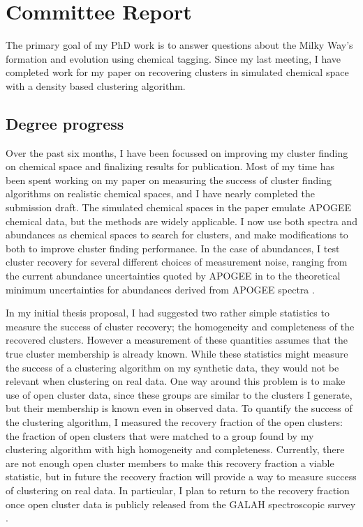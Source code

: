 \documentclass[11pt]{article}
\begin{document}
    
    \section*{Committee Report}
    
    The primary goal of my PhD work is to answer questions about the Milky Way's formation and evolution using chemical tagging. Since my last meeting, I have completed work for my paper on recovering clusters in simulated chemical space with a density based clustering algorithm.    

    \subsection*{Degree progress}

	Over the past six months, I have been focussed on improving my cluster finding on chemical space and finalizing results for publication. Most of my time has been spent working on my paper on measuring the success of cluster finding algorithms on realistic chemical spaces, and I have nearly completed the submission draft. The simulated chemical spaces in the paper emulate APOGEE \citep{Majewski2017} chemical data, but the methods are widely applicable. I now use both spectra and abundances as chemical spaces to search for clusters, and make modifications to both to improve cluster finding performance. In the case of abundances, I test cluster recovery for several different choices of measurement noise, ranging from the current abundance uncertainties quoted by APOGEE in \citealt{DR14} to the theoretical minimum uncertainties for abundances derived from APOGEE spectra \citep{Ting}.
	
	In my initial thesis proposal, I had suggested two rather simple statistics to measure the success of cluster recovery; the homogeneity and completeness of the recovered clusters. However a measurement of these quantities assumes that the true cluster membership is already known. While these statistics might measure the success of a clustering algorithm on my synthetic data, they would not be relevant when clustering on real data. One way around this problem is to make use of open cluster data, since these groups are similar to the clusters I generate, but their membership is known even in observed data. To quantify the success of the clustering algorithm, I measured the recovery fraction of the open clusters: the fraction of open clusters that were matched to a group found by my clustering algorithm with high homogeneity and completeness. Currently, there are not enough open cluster members to make this recovery fraction a viable statistic, but in future the recovery fraction will provide a way to measure success of clustering on real data. In particular, I plan to return to the recovery fraction once open cluster data is publicly released from the GALAH spectroscopic survey \citep{galah}.
    
\end{document}
